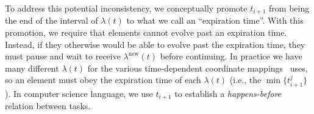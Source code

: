 \begin{bibunit}[unsrtnat]
To address this potential inconsistency, we conceptually promote $t_{i+1}$ from
being the end of the interval of $\lambda(t)$ to what we call an ``expiration
time''. With this promotion, we require that elements cannot evolve past an
expiration time. Instead, if they otherwise would be able to evolve past the
expiration time, they must pause and wait to receive $\lambda^\mathrm{new}(t)$
before continuing. In practice we have many different $\lambda(t)$ for the
various time-dependent coordinate mappings \spectre~uses, so an element must
obey the expiration time of each $\lambda(t)$ (i.e., the $\min\{t^j_{i+1}\}$).
In computer science language, we use $t_{i+1}$ to establish a
\textit{happens-before} relation between tasks.

\begin{figure}
\centering
{}
\end{figure}
\end{bibunit}
